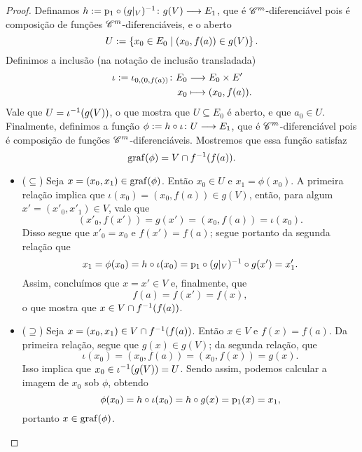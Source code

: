\begin{proof}
Definamos $h := \mathrm{p}_1 \circ (g|_V)^{-1}\colon \allowbreak g(V) \longrightarrow E_1$, %
que é $\mathscr{C}^m$-diferenciável pois é composição de funções $\mathscr{C}^m$-diferenciáveis, e o aberto
	\begin{equation*}
	U := \set{x_0 \in E_0}{(x_0, f(a)) \in g(V)}.%
	\end{equation*}
Definimos a inclusão (na notação de inclusão transladada)
	\begin{align*}
	\iota := {\iota_{0,(0,f(a))}}\colon {E_0} &\longrightarrow {E_0 \times E'} \\{x_0} &\longmapsto (x_0,f(a)).
	\end{align*}
Vale que $U = \iota^{-1}(g(V))$, o que mostra que $U \subseteq E_0$ é aberto, e que $a_0 \in U$. Finalmente, definimos a função $\phi := h \circ \iota\colon \allowbreak U \longrightarrow E_1$, que é $\mathscr{C}^m$-diferenciável pois é composição de funções $\mathscr{C}^m$-diferenciáveis. Mostremos que essa função satisfaz
	\begin{equation*}
	\operatorname{graf}(\phi) = V \cap f^{-1}(f(a)).
	\end{equation*}
\begin{itemize}
\item ($\subseteq$) Seja $x = (x_0,x_1) \in \operatorname{graf}(\phi)$. Então $x_0 \in U$ e $x_1 = \phi(x_0)$. A primeira relação implica que $\iota(x_0) = (x_0,f(a)) \in g(V)$, então, para algum $x' = (x'_0, x'_1) \in V$, vale que%
	\begin{equation*}
	(x'_0, f(x')) = g(x') = (x_0,f(a)) = \iota(x_0).
	\end{equation*}
Disso segue que $x'_0 = x_0$ e $f(x') = f(a)$; segue portanto da segunda relação que
	\begin{equation*}
	x_1 = \phi(x_0) = h \circ \iota(x_0) = \mathrm{p}_1 \circ (g|_{V})^{-1} \circ g(x') = x'_1.
	\end{equation*}
Assim, concluímos que $x = x' \in V$ e, finalmente, que
	\begin{equation*}
	f(a) = f(x') = f(x),
	\end{equation*}
o que mostra que $x \in V \cap f^{-1}(f(a))$.

\item ($\supseteq$) Seja $x = (x_0, x_1) \in V \cap f^{-1}(f(a))$. Então $x \in V$ e $f(x) = f(a)$. Da primeira relação, segue que $g(x) \in g(V)$; da segunda relação, que
	\begin{equation*}
	\iota(x_0) = (x_0, f(a)) = (x_0, f(x)) = g(x).
	\end{equation*}
Isso implica que $x_0 \in \iota^{-1}(g(V)) = U$. Sendo assim, podemos calcular a imagem de $x_0$ sob $\phi$, obtendo
	\begin{equation*}
	\phi(x_0) = h \circ \iota (x_0) = h \circ g(x) = \mathrm{p}_1 (x) = x_1,
	\end{equation*}
portanto $x \in \operatorname{graf}(\phi)$.
\end{itemize}


\end{proof}
